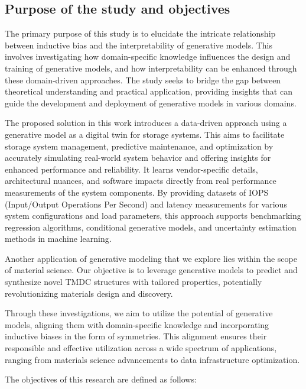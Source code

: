 \newpage
\subsection{Purpose of the study and objectives}

The primary purpose of this study is to elucidate the intricate relationship between inductive bias and the interpretability of generative models. This involves investigating how domain-specific knowledge influences the design and training of generative models, and how interpretability can be enhanced through these domain-driven approaches. The study seeks to bridge the gap between theoretical understanding and practical application, providing insights that can guide the development and deployment of generative models in various domains.


The proposed solution in this work introduces a data-driven approach using a generative model as a digital twin for storage systems. This aims to facilitate  storage system management, predictive maintenance, and optimization by accurately simulating real-world system behavior and offering insights for enhanced performance and reliability. It learns vendor-specific details, architectural nuances, and software impacts directly from real performance measurements of the system components. By providing datasets of IOPS (Input/Output Operations Per Second) and latency measurements for various system configurations and load parameters, this approach supports benchmarking regression algorithms, conditional generative models, and uncertainty estimation methods in machine learning.


Another application of generative modeling that we explore lies within the scope of material science. Our objective is to leverage generative models to predict and synthesize novel TMDC structures with tailored properties, potentially revolutionizing materials design and discovery. 

Through these investigations, we aim to utilize the potential of generative models, aligning them with domain-specific knowledge and incorporating inductive biases in the form of symmetries. This alignment ensures their responsible and effective utilization across a wide spectrum of applications, ranging from materials science advancements to data infrastructure optimization.


The objectives of this research are defined as follows:

